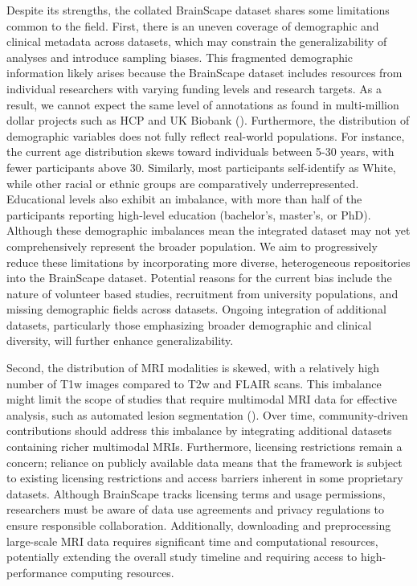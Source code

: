 Despite its strengths, the collated BrainScape dataset shares some limitations common to the field. 
First, there is an uneven coverage of demographic and clinical metadata across datasets, 
which may constrain the generalizability of analyses and introduce sampling biases. 
This fragmented demographic information likely arises because the BrainScape dataset includes resources from individual researchers 
with varying funding levels and research targets. 
As a result, we cannot expect the same level of annotations as found in multi-million dollar projects 
such as HCP and UK Biobank (\cite{van2013wu, miller2016multimodal}).
Furthermore, the distribution of demographic variables does not fully reflect real-world populations. 
For instance, the current age distribution skews toward individuals between 5-30 years, with fewer participants above 30.
Similarly, most participants self-identify as White, while other racial or ethnic groups are comparatively underrepresented. 
Educational levels also exhibit an imbalance, with more than half of the participants reporting high-level education (bachelor's, master's, or PhD).
Although these demographic imbalances mean the integrated dataset may not yet comprehensively represent 
the broader population. We aim to progressively reduce 
these limitations by incorporating more diverse, heterogeneous repositories into the BrainScape dataset. 
Potential reasons for the current bias include the nature of volunteer based studies, 
recruitment from university populations, and missing demographic fields across datasets. 
Ongoing integration of additional datasets, particularly those emphasizing broader demographic 
and clinical diversity, will further enhance generalizability. 

Second, the distribution of MRI modalities is skewed, with a relatively high number of T1w images compared to T2w and FLAIR scans. 
This imbalance might limit the scope of studies that require multimodal MRI data for effective analysis, such as automated lesion segmentation (\cite{menze2014multimodal, spitzer2022interpretable}). 
Over time, community-driven contributions should address this imbalance by integrating additional datasets containing richer multimodal MRIs. 
Furthermore, licensing restrictions remain a concern; reliance on publicly available data means that the framework is subject to existing licensing restrictions 
and access barriers inherent in some proprietary datasets.
Although BrainScape tracks licensing terms and usage permissions, researchers must be aware of 
data use agreements and privacy regulations to ensure responsible collaboration. 
Additionally, downloading and preprocessing large-scale MRI data requires significant time and computational resources, 
potentially extending the overall study timeline and requiring access to high-performance computing resources.

